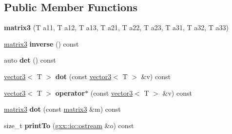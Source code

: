 \subsection*{Public Member Functions}
\begin{DoxyCompactItemize}
\item 
{\bfseries matrix3} (T a11, T a12, T a13, T a21, T a22, T a23, T a31, T a32, T a33)\hypertarget{classmalgo_1_1matrix3_a30d781a8144ac65e0c1487be8ecdd95b}{}\label{classmalgo_1_1matrix3_a30d781a8144ac65e0c1487be8ecdd95b}

\item 
\hyperlink{classmalgo_1_1matrix3}{matrix3} {\bfseries inverse} () const \hypertarget{classmalgo_1_1matrix3_a45463db8d91e446e31b3efbfab757276}{}\label{classmalgo_1_1matrix3_a45463db8d91e446e31b3efbfab757276}

\item 
auto {\bfseries det} () const \hypertarget{classmalgo_1_1matrix3_a3044304646580ff402a0cd842eb39f67}{}\label{classmalgo_1_1matrix3_a3044304646580ff402a0cd842eb39f67}

\item 
\hyperlink{structmalgo_1_1vector3}{vector3}$<$ T $>$ {\bfseries dot} (const \hyperlink{structmalgo_1_1vector3}{vector3}$<$ T $>$ \&v) const \hypertarget{classmalgo_1_1matrix3_a697c63e3f1719d6d82ef0815367c81f8}{}\label{classmalgo_1_1matrix3_a697c63e3f1719d6d82ef0815367c81f8}

\item 
\hyperlink{structmalgo_1_1vector3}{vector3}$<$ T $>$ {\bfseries operator$\ast$} (const \hyperlink{structmalgo_1_1vector3}{vector3}$<$ T $>$ \&v) const \hypertarget{classmalgo_1_1matrix3_a47b90a7ead39bf6fb503fdafed4040da}{}\label{classmalgo_1_1matrix3_a47b90a7ead39bf6fb503fdafed4040da}

\item 
\hyperlink{classmalgo_1_1matrix3}{matrix3} {\bfseries dot} (const \hyperlink{classmalgo_1_1matrix3}{matrix3} \&m) const \hypertarget{classmalgo_1_1matrix3_ab6594e83d0535367b3290ccb5b587720}{}\label{classmalgo_1_1matrix3_ab6594e83d0535367b3290ccb5b587720}

\item 
size\+\_\+t {\bfseries print\+To} (\hyperlink{classgxx_1_1io_1_1ostream}{gxx\+::io\+::ostream} \&o) const \hypertarget{classmalgo_1_1matrix3_aa4e670b13f89af456bf076a496ba09b4}{}\label{classmalgo_1_1matrix3_aa4e670b13f89af456bf076a496ba09b4}

\end{DoxyCompactItemize}
